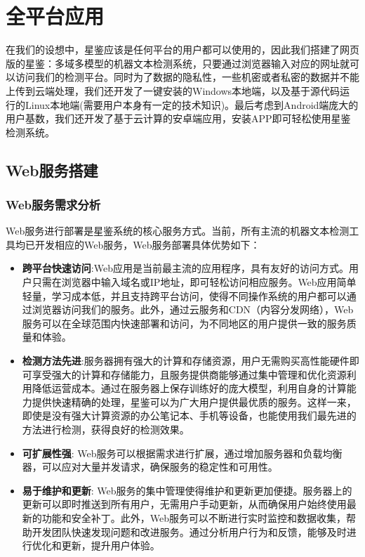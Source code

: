 \documentclass[a4paper]{report}
\begin{document}
\section{全平台应用}
在我们的设想中，星鉴应该是任何平台的用户都可以使用的，因此我们搭建了网页版的星鉴：多域多模型的机器文本检测系统，只要通过浏览器输入对应的网址就可以访问我们的检测平台。同时为了数据的隐私性，一些机密或者私密的数据并不能上传到云端处理，我们还开发了一键安装的Windows本地端，以及基于源代码运行的Linux本地端(需要用户本身有一定的技术知识)。最后考虑到Android端庞大的用户基数，我们还开发了基于云计算的安卓端应用，安装APP即可轻松使用星鉴检测系统。

\subsection{Web服务搭建}
\subsubsection{Web服务需求分析}
Web服务进行部署是星鉴系统的核心服务方式。当前，所有主流的机器文本检测工具均已开发相应的Web服务，Web服务部署具体优势如下：
\begin{itemize}
	\item \textbf{跨平台快速访问}:Web应用是当前最主流的应用程序，具有友好的访问方式。用户只需在浏览器中输入域名或IP地址，即可轻松访问相应服务。Web应用简单轻量，学习成本低，并且支持跨平台访问，使得不同操作系统的用户都可以通过浏览器访问我们的服务。此外，通过云服务和CDN（内容分发网络），Web服务可以在全球范围内快速部署和访问，为不同地区的用户提供一致的服务质量和体验。
	\item \textbf{检测方法先进}:服务器拥有强大的计算和存储资源，用户无需购买高性能硬件即可享受强大的计算和存储能力，且服务提供商能够通过集中管理和优化资源利用降低运营成本。通过在服务器上保存训练好的庞大模型，利用自身的计算能力提供快速精确的处理，星鉴可以为广大用户提供最优质的服务。这样一来，即使是没有强大计算资源的办公笔记本、手机等设备，也能使用我们最先进的方法进行检测，获得良好的检测效果。
	\item \textbf{可扩展性强}: Web服务可以根据需求进行扩展，通过增加服务器和负载均衡器，可以应对大量并发请求，确保服务的稳定性和可用性。
	\item \textbf{易于维护和更新}: Web服务的集中管理使得维护和更新更加便捷。服务器上的更新可以即时推送到所有用户，无需用户手动更新，从而确保用户始终使用最新的功能和安全补丁。此外，Web服务可以不断进行实时监控和数据收集，帮助开发团队快速发现问题和改进服务。通过分析用户行为和反馈，能够及时进行优化和更新，提升用户体验。
\end{itemize}
\end{document}
